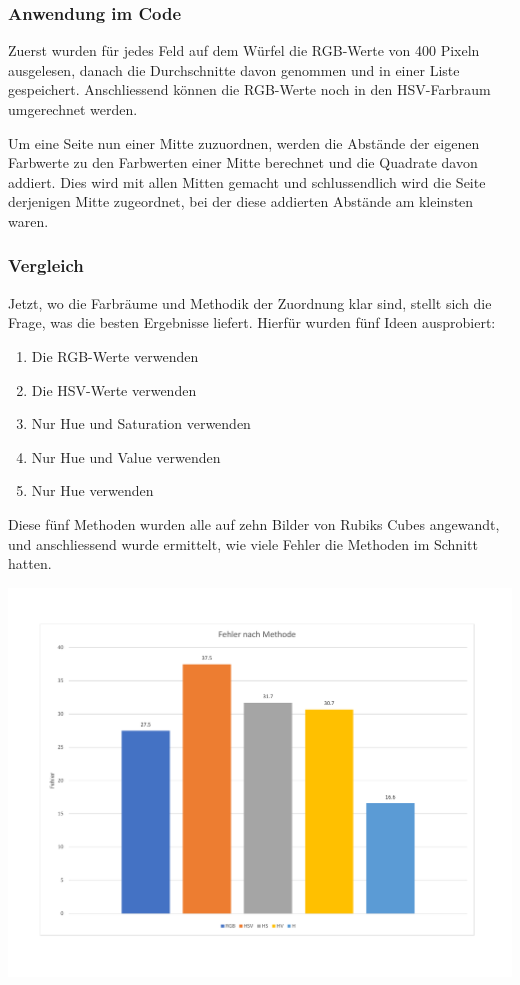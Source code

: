 \documentclass[a4paper, 12pt]{article}
\begin{document}
\subsubsection{Anwendung im Code}

Zuerst wurden für jedes Feld auf dem Würfel die RGB-Werte von 400 Pixeln ausgelesen, danach die Durchschnitte davon genommen und in einer Liste gespeichert. Anschliessend können die RGB-Werte noch in den HSV-Farbraum umgerechnet werden. 

Um eine Seite nun einer Mitte zuzuordnen, werden die Abstände der eigenen Farbwerte zu den Farbwerten einer Mitte berechnet und die Quadrate davon addiert. Dies wird mit allen Mitten gemacht und schlussendlich wird die Seite derjenigen Mitte zugeordnet, bei der diese addierten Abstände am kleinsten waren.
\subsubsection{Vergleich}
Jetzt, wo die Farbräume und Methodik der Zuordnung klar sind, stellt sich die Frage, was die besten Ergebnisse liefert. Hierfür wurden fünf Ideen ausprobiert:
\begin{enumerate}
  \item Die RGB-Werte verwenden
  \item Die HSV-Werte verwenden
  \item Nur Hue und Saturation verwenden
  \item Nur Hue und Value verwenden
  \item Nur Hue verwenden
\end{enumerate}
Diese fünf Methoden wurden alle auf zehn Bilder von Rubiks Cubes angewandt, und anschliessend wurde ermittelt, wie viele Fehler die Methoden im Schnitt hatten. 

\includegraphics[scale=0.4]{Fehler_nach_Methode}
\end{document}
